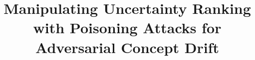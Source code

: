 \documentclass[conference,compsoc]{IEEEtran} %
\begin{document}
		\title{Manipulating Uncertainty Ranking with Poisoning Attacks for Adversarial Concept Drift}

		

\end{document}
